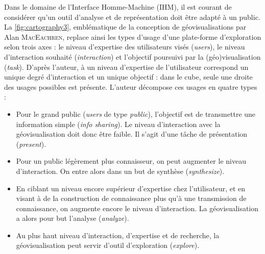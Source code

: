 Dans le domaine de l'Interface Homme-Machine (IHM), il est courant de considérer qu'un outil d'analyse et de représentation doit être adapté à un public.
La \cref{fig:cartography3}, emblématique de la conception de géovisualisations par Alan \textsc{MacEachren}, replace ainsi les types d'usage d'une plate-forme d'exploration selon trois axes : le niveau d'expertise des utilisateurs visés (\textit{users}), le niveau d'interaction souhaité (\textit{interaction}) et l'objectif poursuivi par la (géo)visu\-alisation (\textit{task}).
D'après l'auteur, à un niveau d'expertise de l'utilisateur correspond un unique degré d'interaction et un unique objectif : dans le cube, seule une \og droite\fg{} des usages possibles est présente.
L'auteur décompose ces usages en quatre types :
\begin{itemize}
	\item Pour le grand public (\textit{users} de type \textit{public}), l'objectif est de transmettre une information simple (\textit{info sharing}). Le niveau d'interaction avec la géovisualisation doit donc être faible. Il s'agit d'une tâche de présentation (\textit{present}).
	\item Pour un public légèrement plus connaisseur, on peut augmenter le niveau d'interaction. On entre alors dans un but de synthèse (\textit{synthesize}).
	\item En ciblant un niveau encore supérieur d'expertise chez l'utilisateur, et en visant à de la construction de connaissance plus qu'à une transmission de connaissance, on augmente encore le niveau d'interaction.
	La géovisualisation a alors pour but l'analyse (\textit{analyze}).
	\item Au plus haut niveau d'interaction, d'expertise et de recherche, la géovisualisation peut servir d'outil d'exploration (\textit{explore}).
\end{itemize}


